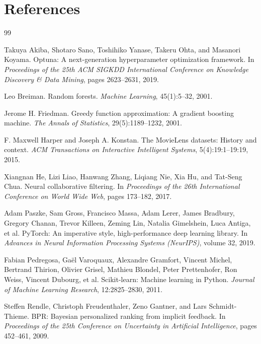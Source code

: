 \section{References}

\begin{thebibliography}{99}

Takuya Akiba, Shotaro Sano, Toshihiko Yanase, Takeru Ohta, and Masanori Koyama.
\newblock Optuna: A next-generation hyperparameter optimization framework.
\newblock In \emph{Proceedings of the 25th ACM SIGKDD International Conference on Knowledge Discovery \& Data Mining}, pages 2623--2631, 2019.

Leo Breiman.
\newblock Random forests.
\newblock \emph{Machine Learning}, 45(1):5--32, 2001.

Jerome H. Friedman.
\newblock Greedy function approximation: A gradient boosting machine.
\newblock \emph{The Annals of Statistics}, 29(5):1189--1232, 2001.

F. Maxwell Harper and Joseph A. Konstan.
\newblock The MovieLens datasets: History and context.
\newblock \emph{ACM Transactions on Interactive Intelligent Systems}, 5(4):19:1--19:19, 2015.

Xiangnan He, Lizi Liao, Hanwang Zhang, Liqiang Nie, Xia Hu, and Tat-Seng Chua.
\newblock Neural collaborative filtering.
\newblock In \emph{Proceedings of the 26th International Conference on World Wide Web}, pages 173--182, 2017.

Adam Paszke, Sam Gross, Francisco Massa, Adam Lerer, James Bradbury, Gregory Chanan,
Trevor Killeen, Zeming Lin, Natalia Gimelshein, Luca Antiga, et al.
\newblock PyTorch: An imperative style, high-performance deep learning library.
\newblock In \emph{Advances in Neural Information Processing Systems (NeurIPS)}, volume 32, 2019.

Fabian Pedregosa, Ga\"el Varoquaux, Alexandre Gramfort, Vincent Michel,
Bertrand Thirion, Olivier Grisel, Mathieu Blondel, Peter Prettenhofer,
Ron Weiss, Vincent Dubourg, et al.
\newblock Scikit-learn: Machine learning in Python.
\newblock \emph{Journal of Machine Learning Research}, 12:2825--2830, 2011.

Steffen Rendle, Christoph Freudenthaler, Zeno Gantner, and Lars Schmidt-Thieme.
\newblock BPR: Bayesian personalized ranking from implicit feedback.
\newblock In \emph{Proceedings of the 25th Conference on Uncertainty in Artificial Intelligence}, pages 452--461, 2009.

\end{thebibliography}
